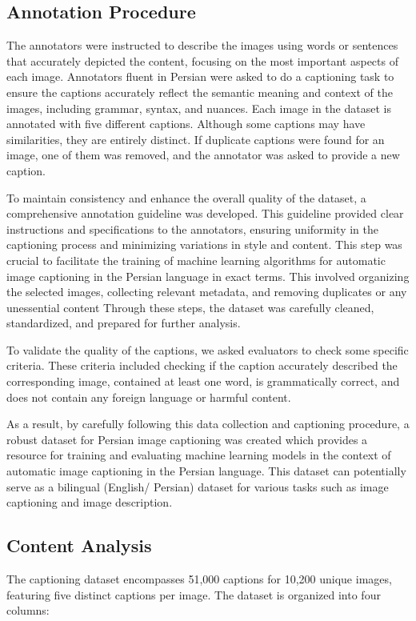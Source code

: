 \documentclass[runningheads]{llncs}
\begin{document}
\subsection{Annotation Procedure}
The annotators were instructed to describe the images using words or sentences that accurately depicted the content, focusing on the most important aspects of each image. Annotators fluent in Persian were asked to do a captioning task to ensure the captions accurately reflect the semantic meaning and context of the images, including grammar, syntax, and nuances. Each image in the dataset is annotated with five different captions. Although some captions may have similarities, they are entirely distinct. If duplicate captions were found for an image, one of them was removed, and the annotator was asked to provide a new caption.

To maintain consistency and enhance the overall quality of the dataset, a comprehensive annotation guideline was developed. This guideline provided clear instructions and specifications to the annotators, ensuring uniformity in the captioning process and minimizing variations in style and content. This step was crucial to facilitate the training of machine learning algorithms for automatic image captioning in the Persian language in exact terms. This involved organizing the selected images, collecting relevant metadata, and removing duplicates or any unessential content Through these steps, the dataset was carefully cleaned, standardized, and prepared for further analysis. 

To validate the quality of the captions, we asked evaluators to check some specific criteria. These criteria included checking if the caption accurately described the corresponding image, contained at least one word, is grammatically correct, and does not contain any foreign language or harmful content. 

As a result, by carefully following this data collection and captioning procedure, a robust dataset for Persian image captioning was created which provides a resource for training and evaluating machine learning models in the context of automatic image captioning in the Persian language. This dataset can potentially serve as a bilingual (English/ Persian) dataset for various tasks such as image captioning and image description.

\subsection{Content Analysis}
The captioning dataset encompasses 51,000 captions for 10,200 unique images, featuring five distinct captions per image. The dataset is organized into four columns:
\end{document}
